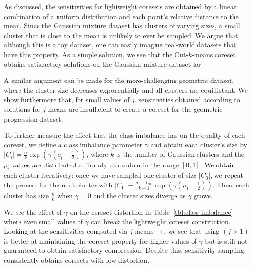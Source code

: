 As discussed, the sensitivities for lightweight coresets are obtained by a linear combination of a uniform distribution and each point's relative
distance to the mean. Since the Gaussian mixture dataset has clusters of varying sizes, a small cluster that is close to the mean is unlikely
to ever be sampled. We argue that, although this is a toy dataset, one can easily imagine real-world datasets that have this property. 
As a simple solution, we see that the Cut-$k$-means coreset obtains satisfactory solutions on the Gaussian mixture dataset for 

A similar argument can be made for the more-challenging geometric dataset, where the cluster size decreases exponentially and all clusters are equidistant.
We show furthermore that, for small values of $j$, sensitivities obtained according to
solutions for $j$-means are insufficient to create a coreset for the geometric-progression dataset.

To further measure the effect that the class imbalance has on the quality of each coreset, we define a class imbalance parameter $\gamma$ and obtain each
cluster's size by $|C_i| = \frac{n}{k} \exp \left( \gamma(\rho_i - \frac{1}{2}) \right)$, where $k$ is the number of Gaussian clusters and the $\rho_i$ values
are distributed uniformly at random in the range $[0, 1]$.  We obtain each cluster iteratively: once we have sampled one cluster of size $|C_0|$, we repeat the
process for the next cluster with $|C_1| = \frac{n - |C_0|}{k-1}\exp \left( \gamma(\rho_1 - \frac{1}{2}) \right)$.  Thus, each cluster has size $\frac{n}{k}$
when $\gamma = 0$ and the cluster sizes diverge as $\gamma$ grows. 


We see the effect of $\gamma$ on the coreset distortion in Table~\ref{tbl:class-imbalance}, where even
small values of $\gamma$ can break the lightweight coreset construction.   Looking at the sensitivities computed via $j$-means++, we see that using $(j>1)$ is better at maintaining the coreset
property for higher values of $\gamma$ but is still not guaranteed to obtain satisfactory compression. Despite this, sensitivity sampling consistently obtains
coresets with low distortion.



